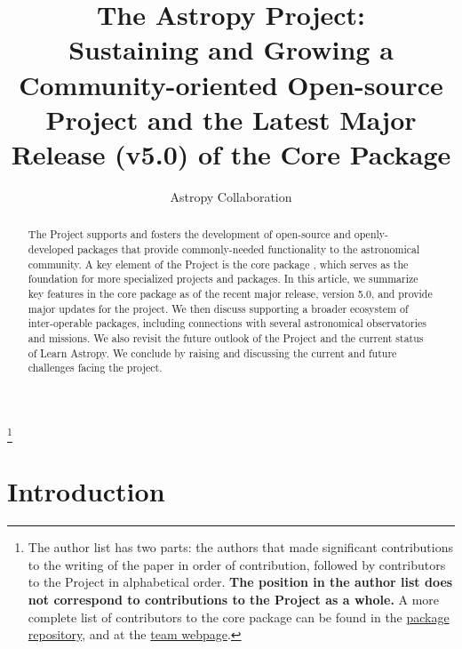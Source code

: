 \documentclass[modern]{aastex631}
\newcommand{\secauthor}[1]{{\color{blue}Author:~\textit{#1}}}
\begin{document}
\draft{\today}

\title{The Astropy Project: \\
       Sustaining and Growing a Community-oriented Open-source Project and
       the Latest Major Release (v5.0) of the Core Package}


\author{Astropy Collaboration}
\noaffiliation
{\let\thefootnote\relax\footnote{{The author list has two parts: the authors that made significant contributions to the writing of the paper in order of contribution, followed by contributors to the \astropy Project in alphabetical order. \textbf{The position in the author list does not correspond to contributions to the \astropy Project as a whole.} A more complete list of contributors to the core package can be found in the \href{https://github.com/astropy/astropy/graphs/contributors}{package repository}, and at the \href{http://www.astropy.org/team.html}{\astropy team webpage}.}}}

% 

\begin{abstract}
The \astropy Project supports and fosters the development of open-source and openly-developed
\python packages that provide commonly-needed functionality to the astronomical
community.
A key element of the \astropy Project is the core package \astropypkg, which serves as the
foundation for more specialized projects and packages.
In this article, we summarize key features in the core package as of the recent major
release, version 5.0, and provide major updates for the project.
We then discuss supporting a broader ecosystem of inter-operable packages,
including connections with several astronomical observatories and missions.
We also revisit the future outlook of the \astropy Project and the current
status of Learn Astropy.
We conclude by raising and discussing the current and future challenges facing the project.
\end{abstract}



\section{Introduction} \label{sec:intro}

\end{document}

